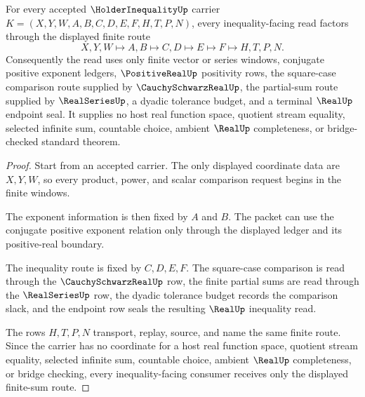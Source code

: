 \begin{theorem}\label{thm:holder-inequality-finite-sum-route}
For every accepted $\HolderInequalityUp$ carrier $K=(X,Y,W,A,B,C,D,E,F,H,T,P,N)$, every inequality-facing read factors through the displayed finite route
$$
X,Y,W \longmapsto A,B \longmapsto C,D \longmapsto E \longmapsto F \longmapsto H,T,P,N .
$$
Consequently the read uses only finite vector or series windows, conjugate positive exponent ledgers, $\PositiveRealUp$ positivity rows, the square-case comparison route supplied by $\CauchySchwarzRealUp$, the partial-sum route supplied by $\RealSeriesUp$, a dyadic tolerance budget, and a terminal $\RealUp$ endpoint seal. It supplies no host real function space, quotient stream equality, selected infinite sum, countable choice, ambient $\RealUp$ completeness, or bridge-checked standard theorem.
\end{theorem}
\begin{proof}
Start from an accepted carrier. The only displayed coordinate data are $X,Y,W$, so every product, power, and scalar comparison request begins in the finite windows.

The exponent information is then fixed by $A$ and $B$. The packet can use the conjugate positive exponent relation only through the displayed ledger and its positive-real boundary.

The inequality route is fixed by $C,D,E,F$. The square-case comparison is read through the $\CauchySchwarzRealUp$ row, the finite partial sums are read through the $\RealSeriesUp$ row, the dyadic tolerance budget records the comparison slack, and the endpoint row seals the resulting $\RealUp$ inequality read.

The rows $H,T,P,N$ transport, replay, source, and name the same finite route. Since the carrier has no coordinate for a host real function space, quotient stream equality, selected infinite sum, countable choice, ambient $\RealUp$ completeness, or bridge checking, every inequality-facing consumer receives only the displayed finite-sum route.
\end{proof}


